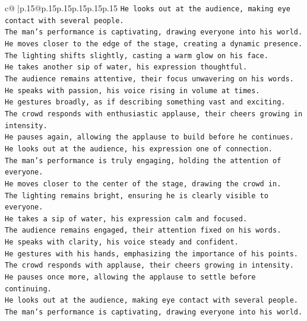 \documentclass{article}
\begin{document}
{\begin{supertabular}{c@{$\;$}|p{.15\linewidth}@{}p{.15\linewidth}p{.15\linewidth}p{.15\linewidth}p{.15\linewidth}p{.15\linewidth}}
{{{\texttt{He looks out at the audience, making eye contact with several people.  } \\
\texttt{The man's performance is captivating, drawing everyone into his world.  } \\
\texttt{He moves closer to the edge of the stage, creating a dynamic presence.  } \\
\texttt{The lighting shifts slightly, casting a warm glow on his face.  } \\
\texttt{He takes another sip of water, his expression thoughtful.  } \\
\texttt{The audience remains attentive, their focus unwavering on his words.  } \\
\texttt{He speaks with passion, his voice rising in volume at times.  } \\
\texttt{He gestures broadly, as if describing something vast and exciting.  } \\
\texttt{The crowd responds with enthusiastic applause, their cheers growing in intensity.  } \\
\texttt{He pauses again, allowing the applause to build before he continues.  } \\
\texttt{He looks out at the audience, his expression one of connection.  } \\
\texttt{The man's performance is truly engaging, holding the attention of everyone.  } \\
\texttt{He moves closer to the center of the stage, drawing the crowd in.  } \\
\texttt{The lighting remains bright, ensuring he is clearly visible to everyone.  } \\
\texttt{He takes a sip of water, his expression calm and focused.  } \\
\texttt{The audience remains engaged, their attention fixed on his words.  } \\
\texttt{He speaks with clarity, his voice steady and confident.  } \\
\texttt{He gestures with his hands, emphasizing the importance of his points.  } \\
\texttt{The crowd responds with applause, their cheers growing in intensity.  } \\
\texttt{He pauses once more, allowing the applause to settle before continuing.  } \\
\texttt{He looks out at the audience, making eye contact with several people.  } \\
\texttt{The man's performance is captivating, drawing everyone into his world.  } \\
}}}
\end{supertabular}}
\end{document}

